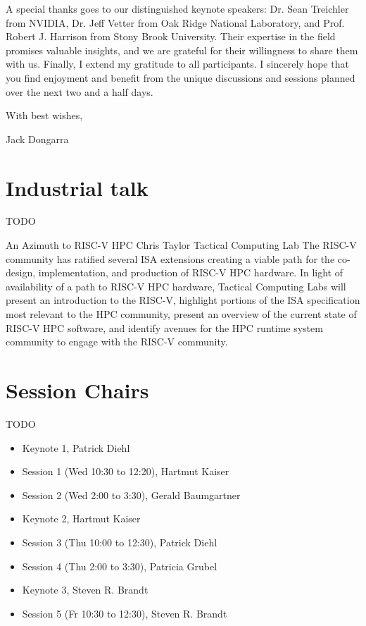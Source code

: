 \documentclass[12pt,letterpaper]{book}
\newenvironment{conf-abstract}[4][]{
 \needspace{10\baselineskip}
 \begin{center}
 { \renewcommand\textsuperscript[1]{}
 \phantomsection\addcontentsline{toc}{section}
 {\texorpdfstring{#2 (\emph{#3})}{#2 (#3)}}
 }
 {{\large\bfseries #2}\marginnote{#1}\par}
 \medskip
 {#3\par}
 \smallskip
 {\small #4\par}
 \end{center}
}{%
 \bigskip
 \hrule
 \bigskip
}
\begin{document}
\noindent A special thanks goes to our distinguished keynote speakers: Dr. Sean
Treichler from NVIDIA, Dr. Jeff Vetter from Oak Ridge National
Laboratory, and Prof. Robert J. Harrison from Stony Brook University.
Their expertise in the field promises valuable insights, and we are
grateful for their willingness to share them with us. Finally, I extend
my gratitude to all participants. I sincerely hope that you find
enjoyment and benefit from the unique discussions and sessions planned
over the next two and a half days.

\noindent With best wishes,

Jack Dongarra


%

\newpage



\tableofcontents

\mainmatter

\chapter{Industrial talk}

TODO

\begin{conf-abstract}[27$^{th}$]
{An Azimuth to RISC-V HPC}
{Chris Taylor}
{Tactical Computing Lab}
The RISC-V community has ratified several ISA extensions creating a viable path for the co-design, implementation, and production of RISC-V HPC hardware. In light of availability of a path to RISC-V HPC hardware, Tactical Computing Labs will present an introduction to the RISC-V, highlight portions of the ISA specification most relevant to the HPC community, present an overview of the current state of RISC-V HPC software,  and identify avenues for the HPC runtime system community to engage with the RISC-V community.
\end{conf-abstract}

\chapter{Session Chairs}

TODO

\begin{itemize}
\item Keynote 1, Patrick Diehl
\item Session 1 (Wed 10:30 to 12:20), Hartmut Kaiser 
\item Session 2 (Wed 2:00 to 3:30), Gerald Baumgartner
\item Keynote 2, Hartmut Kaiser
\item Session 3 (Thu 10:00 to 12:30), Patrick Diehl
\item Session 4 (Thu 2:00 to 3:30), Patricia Grubel
\item Keynote 3, Steven R. Brandt
\item Session 5 (Fr 10:30 to 12:30), Steven R. Brandt 
\end{itemize}
\end{document}
